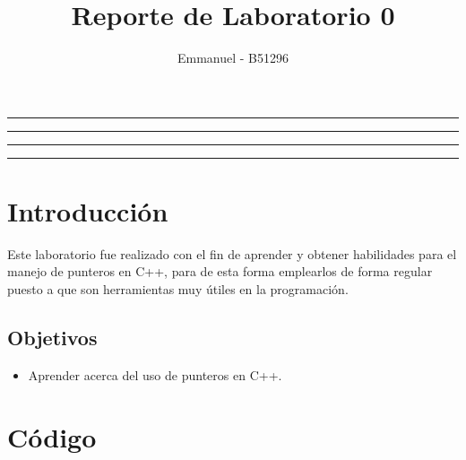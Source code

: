 \documentclass[11pt]{article}
\title{Reporte de Laboratorio 0}
\author{Emmanuel - B51296}
\begin{document}
\maketitle
\hrule
\hrule
\tableofcontents
\hspace{5mm}
\hrule
\hrule


\section{Introducción}
Este laboratorio fue realizado con el fin de aprender y obtener habilidades para el manejo de punteros en C++, para de esta forma emplearlos de forma regular puesto a que son herramientas muy útiles en la programación.
\subsection{Objetivos}
\begin{itemize}
	\item Aprender acerca del uso de punteros en C++.
\end{itemize}

\section{Código}
\end{document}
